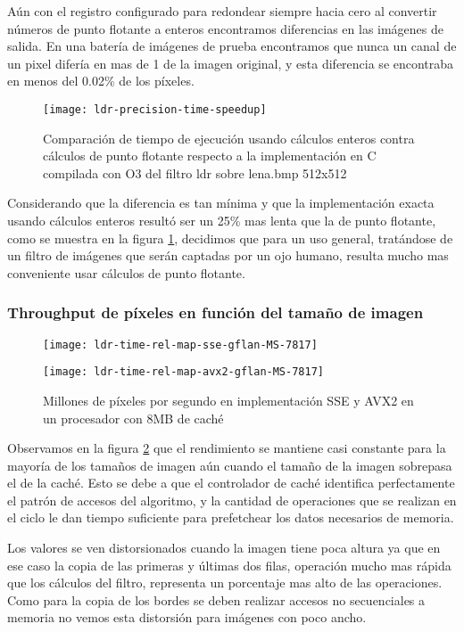 Aún con el registro  configurado para redondear siempre hacia cero al convertir números de punto flotante a enteros encontramos diferencias en las imágenes de salida. En una batería de imágenes de prueba encontramos que nunca un canal de un pixel difería en mas de 1 de la imagen original, y esta diferencia se encontraba en menos del 0.02\% de los píxeles.

\begin{figure}[H]
    \centering
    \texttt{[image: ldr-precision-time-speedup]}
    \caption{Comparación de tiempo de ejecución usando cálculos enteros contra cálculos de punto flotante respecto a la implementación en C compilada con O3 del filtro ldr sobre lena.bmp 512x512}
    \label{fig:ldr-precision-time-speedup}
\end{figure}

Considerando que la diferencia es tan mínima y que la implementación exacta usando cálculos enteros resultó ser un 25\% mas lenta que la de punto flotante, como se muestra en la figura \ref{fig:ldr-precision-time-speedup}, decidimos que para un uso general, tratándose de un filtro de imágenes que serán captadas por un ojo humano, resulta mucho mas conveniente usar cálculos de punto flotante.

\subsubsection{Throughput de píxeles en función del tamaño de imagen}

\begin{figure}[H]
    \centering
    \begin{minipage}[t]{0.49\linewidth}
    \centering
    \texttt{[image: ldr-time-rel-map-sse-gflan-MS-7817]}
    \end{minipage}
    \hfill
    \begin{minipage}[t]{0.49\linewidth}
    \centering
    \texttt{[image: ldr-time-rel-map-avx2-gflan-MS-7817]}
    \end{minipage}
    \caption{Millones de píxeles por segundo en implementación SSE y AVX2 en un procesador con 8MB de caché}
    \label{fig:ldr-perdida-precision}
\end{figure}

Observamos en la figura \ref{fig:ldr-perdida-precision} que el rendimiento se mantiene casi constante para la mayoría de los tamaños de imagen aún cuando el tamaño de la imagen sobrepasa el de la caché. Esto se debe a que el controlador de caché identifica perfectamente el patrón de accesos del algoritmo, y la cantidad de operaciones que se realizan en el ciclo le dan tiempo suficiente para prefetchear los datos necesarios de memoria.

Los valores se ven distorsionados cuando la imagen tiene poca altura ya que en ese caso la copia de las primeras y últimas dos filas, operación mucho mas rápida que los cálculos del filtro, representa un porcentaje mas alto de las operaciones. Como para la copia de los bordes se deben realizar accesos no secuenciales a memoria no vemos esta distorsión para imágenes con poco ancho.

